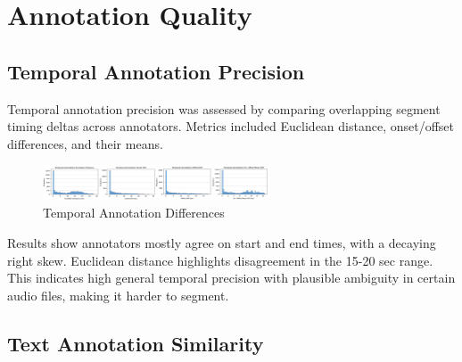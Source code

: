 \documentclass{article}
\begin{document}
\section{Annotation Quality}
\label{sec:annotation_quality}

\subsection{Temporal Annotation Precision}

Temporal annotation precision was assessed by comparing overlapping segment timing deltas across annotators. Metrics included Euclidean distance, onset/offset differences, and their means.  

\begin{figure}[H]
  \centering
  \includegraphics[width=0.6\textwidth]{figures/annotation_quality/temporal_annotation_differences_2.png}
  \caption{Temporal Annotation Differences}
  \label{fig:temporal_diff}
\end{figure}

Results show annotators mostly agree on start and end times, with a decaying right skew. Euclidean distance highlights disagreement in the 15-20 sec range. This indicates high general temporal precision with plausible ambiguity in certain audio files, making it harder to segment.

\subsection{Text Annotation Similarity}
\end{document}
